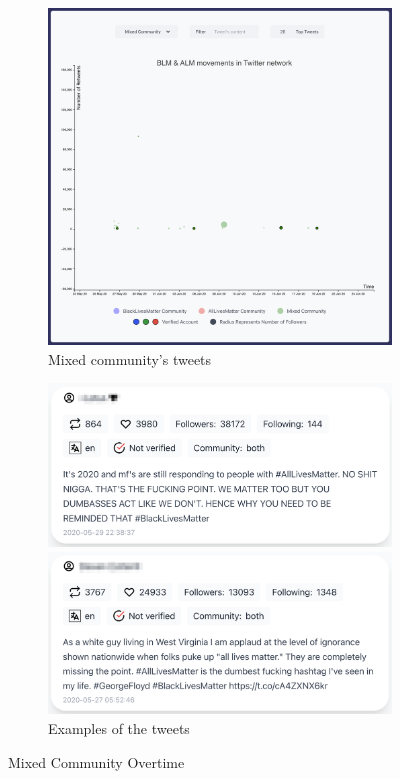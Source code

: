 \begin{figure}[H]
\begin{subfigure}{.45\textwidth}
  \centering
  \captionsetup{justification=centering}
  \includegraphics[width=0.9\linewidth]{./pics/obserm.png}  
 
  \caption{Mixed community's tweets}
  \label{fig:sub-first-mctweets}
\end{subfigure}
\begin{subfigure}{.45\textwidth}
  \centering
  \captionsetup{justification=centering}
  \includegraphics[width=0.9\linewidth]{./pics/obserm1.png}
  
  \includegraphics[width=0.9\linewidth]{./pics/obserm2.png}
  \caption{Examples of the tweets}
  \label{fig:sub-second-extws}
\end{subfigure}

\captionsetup{justification=centering}
\caption{Mixed Community Overtime}
\label{fig:e-mixed-overtime}
\end{figure}


